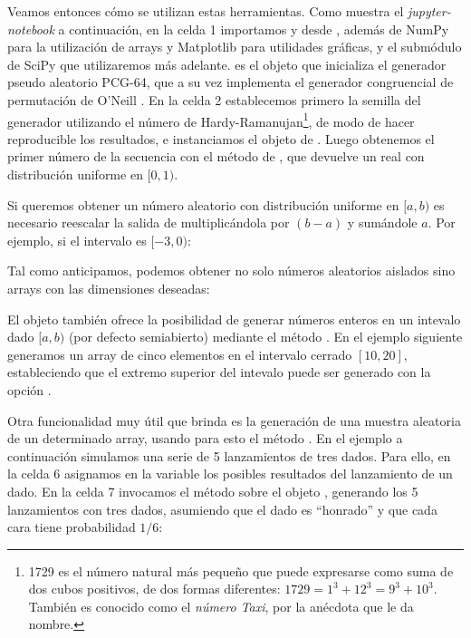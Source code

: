 Veamos entonces cómo se utilizan estas herramientas. Como muestra el \textit{jupyter-notebook} a continuación, en la celda 1 importamos  y  desde , además de NumPy para la utilización de arrays y Matplotlib para utilidades gráficas, y el submódulo  de SciPy que utilizaremos más adelante.  es el objeto  que inicializa el generador pseudo aleatorio PCG-64, que a su vez implementa el generador congruencial de permutación de O'Neill \citep{oneill2014}. En la celda 2 establecemos primero la semilla del generador utilizando el número de Hardy-Ramanujan\footnote{1729 es el número natural más pequeño que puede expresarse como suma de dos cubos positivos, de dos formas diferentes: $1729 = 1^3 + 12^3 = 9^3 + 10^3$. También es conocido como el \textit{número Taxi}, por la anécdota que le da nombre.}, de modo de hacer reproducible los resultados, e instanciamos el objeto  de . Luego obtenemos el primer número de la secuencia con el método  de , que devuelve un real con distribución uniforme en $[0, 1)$. 


Si queremos obtener un número aleatorio con distribución uniforme en $[a, b)$ es necesario reescalar la salida de  multiplicándola por $(b - a)$ y sumándole $a$. Por ejemplo, si el intervalo es $[-3,  0)$:


Tal como anticipamos, podemos obtener no solo números aleatorios aislados sino arrays con las dimensiones deseadas:



El objeto  también ofrece la posibilidad de generar números enteros en un intevalo dado $[a, b)$ (por defecto semiabierto) mediante el método . En el ejemplo siguiente generamos un array de cinco elementos en el intervalo  cerrado $[10, 20]$, estableciendo que el extremo superior del intevalo puede ser generado con la opción . 


Otra funcionalidad muy útil que brinda  es la generación de una muestra aleatoria de un determinado array, usando para esto el método . En el ejemplo a continuación simulamos una serie de 5 lanzamientos de tres dados. Para ello, en la celda 6 asignamos en la variable  los posibles resultados del lanzamiento de un dado. En la celda 7 invocamos el método  sobre el objeto , generando los 5 lanzamientos con tres dados, asumiendo que el dado es ``honrado'' y que cada cara tiene probabilidad $1/6$:

